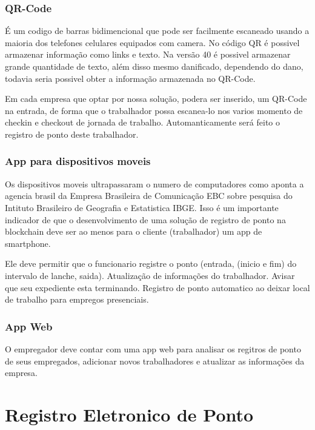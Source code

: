 \documentclass[12pt,openright,twoside,a4paper,english, brazil]{abntex2} %
\begin{document}


\subsection{QR-Code}

É um codigo de barras bidimencional que pode ser facilmente escaneado usando a maioria dos telefones celulares equipados com camera. No código QR é possivel armazenar informação como links e texto. Na versão 40 é possivel armazenar grande quantidade de texto, além disso mesmo danificado, dependendo do dano, todavia seria possivel obter a informação armazenada no QR-Code.

Em cada empresa que optar por nossa solução, podera ser inserido, um QR-Code na entrada, de forma que o trabalhador possa escanea-lo nos varios momento de checkin e checkout de jornada de trabalho. Automanticamente será feito o registro de ponto deste trabalhador.


\subsection{App para dispositivos moveis}

Os dispositivos moveis ultrapassaram o numero de computadores como aponta a agencia brasil da Empresa Brasileira de Comunicação \gls{EBC} sobre pesquisa do Intituto Brasileiro de Geografia e Estatistica \gls{IBGE}. Isso é um importante indicador de que o desenvolvimento de uma solução de registro de ponto na blockchain deve ser ao menos para o cliente (trabalhador) um app de smartphone.

Ele deve permitir que o funcionario registre o ponto (entrada, (inicio e fim) do intervalo de lanche, saida). Atualização de informações do trabalhador. Avisar que seu expediente esta terminando. Registro de ponto automatico ao deixar local de trabalho para empregos presenciais. 

\subsection{App Web}

O empregador deve contar com uma app web para analisar os regitros de ponto de seus empregados, adicionar novos trabalhadores e atualizar as informações da empresa.


\chapter{Registro Eletronico de Ponto}
\end{document}
